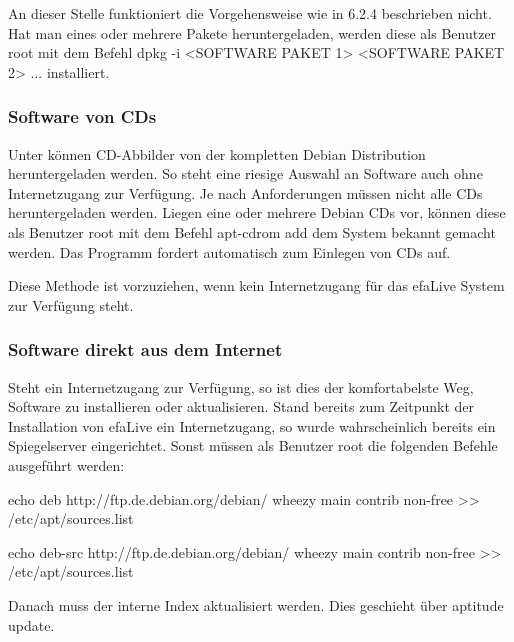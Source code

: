 \documentclass[a4paper,12pt,twoside]{article}
\newcounter{Abb}
\begin{document}
An dieser Stelle funktioniert die Vorgehensweise wie in 6.2.4
beschrieben nicht. Hat man eines oder mehrere Pakete heruntergeladen,
werden diese als Benutzer {\textquotedbl}root{\textquotedbl} mit dem
Befehl {\textquotedbl}dpkg -i {\textless}SOFTWARE PAKET 1{\textgreater}
{\textless}SOFTWARE PAKET 2{\textgreater} ...{\textquotedbl}
installiert. 


\bigskip

\subsubsection{Software von CDs}
Unter \cite{DEB4} können CD-Abbilder von der kompletten Debian
Distribution heruntergeladen werden. So steht eine riesige Auswahl an
Software auch ohne Internetzugang zur Verfügung. Je nach Anforderungen
müssen nicht alle CDs heruntergeladen werden. Liegen eine oder mehrere
Debian CDs vor, können diese als Benutzer
{\textquotedbl}root{\textquotedbl} mit dem Befehl
{\textquotedbl}apt-cdrom add{\textquotedbl} dem System bekannt gemacht
werden. Das Programm fordert automatisch zum Einlegen von CDs auf.

Diese Methode ist vorzuziehen, wenn kein Internetzugang für das efaLive
System zur Verfügung steht.


\bigskip

\subsubsection{Software direkt aus dem Internet}
Steht ein Internetzugang zur Verfügung, so ist dies der komfortabelste
Weg, Software zu installieren oder aktualisieren. Stand bereits zum
Zeitpunkt der Installation von efaLive ein Internetzugang, so wurde
wahrscheinlich bereits ein Spiegelserver eingerichtet. Sonst müssen als
Benutzer {\textquotedbl}root{\textquotedbl} die folgenden Befehle
ausgeführt werden:


\bigskip

echo {\textquotedbl}deb http://ftp.de.debian.org/debian/ wheezy main
contrib non-free{\textquotedbl} {\textgreater}{\textgreater}
/etc/apt/sources.list

echo {\textquotedbl}deb-src http://ftp.de.debian.org/debian/ wheezy main
contrib non-free{\textquotedbl} {\textgreater}{\textgreater}
/etc/apt/sources.list


\bigskip

Danach muss der interne Index aktualisiert werden. Dies geschieht über
{\textquotedbl}aptitude update{\textquotedbl}.
\end{document}
